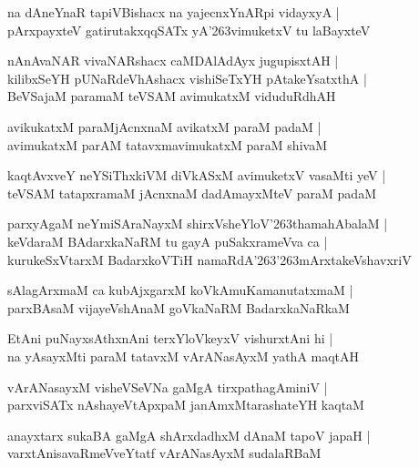 \documentclass[twoside,12pt,openright]{book}
\def\S{\char'263}
\newcounter{shloka}[chapter]
\begin{document}
\begin{shloka}
na dAneYnaR tapiVBishacx na yajecnxYnARpi vidayxyA |\\
pArxpayxteV gatirutakxqqSATx yA\S vimuketxV tu laBayxteV 
\end{shloka}

\begin{shloka}
nAnAvaNAR vivaNARshacx caMDAlAdAyx jugupisxtAH |\\
kilibxSeYH pUNaRdeVhAshacx vishiSeTxYH pAtakeYsatxthA |\\
BeVSajaM paramaM teVSAM avimukatxM viduduRdhAH
\end{shloka}

\begin{shloka}
avikukatxM paraMjAcnxnaM avikatxM paraM padaM |\\
avimukatxM parAM tatavxmavimukatxM paraM shivaM 
\end{shloka}

\begin{shloka}
kaqtAvxveY neYSiThxkiVM diVkASxM avimuketxV vasaMti yeV |\\
teVSAM tatapxramaM jAcnxnaM dadAmayxMteV paraM padaM
\end{shloka}

\begin{shloka}
parxyAgaM neYmiSAraNayxM shirxVsheYloV\S thamahAbalaM |\\
keVdaraM BAdarxkaNaRM tu gayA puSakxrameVva ca |\\
kurukeSxVtarxM BadarxkoVTiH namaRdA\S \S mArxtakeVshavxriV 
\end{shloka}

\begin{shloka}
sAlagArxmaM ca kubAjxgarxM koVkAmuKamanutatxmaM |\\
parxBAsaM vijayeVshAnaM goVkaNaRM BadarxkaNaRkaM 
\end{shloka}

\begin{shloka}
EtAni puNayxsAthxnAni terxYloVkeyxV vishurxtAni hi |\\
na yAsayxMti paraM tatavxM vArANasAyxM yathA maqtAH
\end{shloka}

\begin{shloka}
vArANasayxM visheVSeVNa gaMgA tirxpathagAminiV |\\
parxviSATx nAshayeVtApxpaM janAmxMtarashateYH kaqtaM 
\end{shloka}

\begin{shloka}
anayxtarx sukaBA gaMgA shArxdadhxM dAnaM tapoV japaH |\\
varxtAnisavaRmeVveYtatf vArANasAyxM sudalaRBaM 
\end{shloka}
\end{document}
